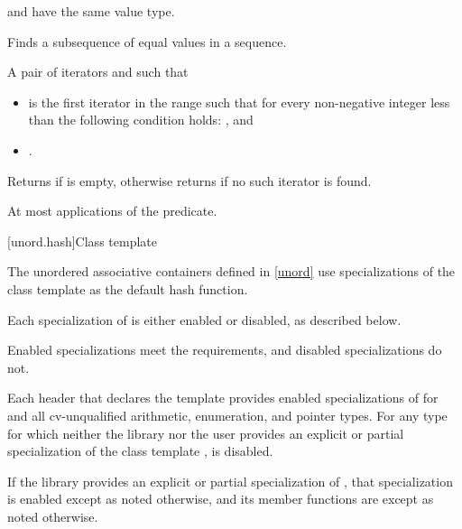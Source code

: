 \begin{itemdescr}
\pnum
\mandates
{} and 
have the same value type.

\pnum
\effects
Finds a subsequence of equal values in a sequence.

\pnum
\returns
A pair of iterators  and  such that
\begin{itemize}
\item {} is the first iterator in the range
 such that
for every non-negative integer  less than 
the following condition holds:
, and
\item {}.
\end{itemize}
Returns  if  is empty,
otherwise returns  if no such iterator is found.

\pnum
\complexity
At most  applications of the predicate.
\end{itemdescr}

[unord.hash]{Class template }

\pnum
{}%
%
The unordered associative containers defined in \ref{unord} use
specializations of the class template 
as the default hash function.

\pnum
Each specialization of  is either enabled or disabled,
as described below.
\begin{note}
Enabled specializations meet the  requirements, and
disabled specializations do not.
\end{note}
Each header that declares the template 
provides enabled specializations of  for  and
all cv-unqualified arithmetic, enumeration, and pointer types.
For any type  for which neither the library nor the user provides
an explicit or partial specialization of the class template ,
 is disabled.

\pnum
If the library provides an explicit or partial specialization of ,
that specialization is enabled except as noted otherwise,
and its member functions are  except as noted otherwise.

